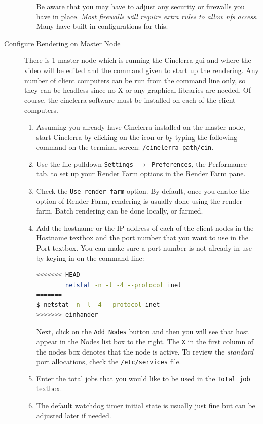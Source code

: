 \begin{description}
\begin{enumerate}
        Be aware that you may have to adjust any security or firewalls you have in place.  \textit{Most firewalls will require extra rules to allow nfs access}.  Many have built-in configurations for this. 
    \end{enumerate}
    \item[Configure Rendering on Master Node] There is 1 master node which is running the Cinelerra gui and where the video will be edited and the command given to start up the rendering.  Any number of client computers can be run from the command line only, so they can be headless since no X or any graphical libraries are needed.  Of course, the cinelerra software must be installed on each of the client computers.
    \begin{enumerate}
        \item Assuming you already have Cinelerra installed on the master node, start Cinelerra by clicking on the
        icon or by typing the following command on the terminal screen:  \texttt{/{cinelerra\_path}/cin}.
        \item Use the file pulldown \texttt{Settings $\rightarrow$ Preferences}, the Performance tab, to set up your Render Farm
        options in the Render Farm pane.
        \item Check the \texttt{Use render farm} option.  By default, once you enable the option of Render Farm, rendering is usually done using the render farm.  Batch rendering can be done locally, or farmed.
        \item Add the hostname or the IP address of each of the client nodes in the Hostname textbox and the port
        number that you want to use in the Port textbox.  You can make sure a port number is not already in
        use by keying in on the command line:
        \begin{lstlisting}[language=bash]
<<<<<<< HEAD
        netstat -n -l -4 --protocol inet
=======
$ netstat -n -l -4 --protocol inet
>>>>>>> einhander
        \end{lstlisting}
        Next, click on the \texttt{Add Nodes}
        button and then you will see that host appear in the Nodes list box to the right.  The \texttt{X} in the first
        column of the nodes box denotes that the node is active.  To review the \textit{standard} port allocations,
        check the \texttt{/etc/services} file.
        \item Enter the total jobs that you would like to be used in the \texttt{Total job} textbox.
        \item The default watchdog timer initial state is usually just fine but can be adjusted later if needed.

\end{enumerate}
\end{description}
